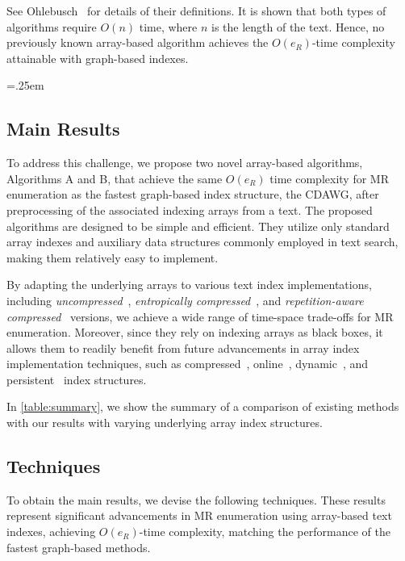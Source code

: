 See Ohlebusch~\cite{ohlebusch2013bookbioinfo} for details of their definitions. 
It is shown that both types of algorithms require $O(n)$ time, where $n$ is the length of the text. Hence, no previously known array-based algorithm achieves the $O(e_R)$-time complexity attainable with graph-based indexes.

\begin{table}[t]\centering\tabcolsep=.25em 
\end{table}

\subsection{Main Results}
To address this challenge, we propose two novel array-based algorithms, Algorithms A and B, that achieve the same $O(e_R)$ time complexity for MR enumeration as the fastest graph-based index structure, the CDAWG, after preprocessing of the associated indexing arrays from a text. 
The proposed algorithms are designed to be simple and efficient. They utilize only standard array indexes and auxiliary data structures commonly employed in text search, making them relatively easy to implement. 

By adapting the underlying arrays to various text index implementations, including \textit{uncompressed}~\cite{manber:myers1993suffixarrays,Ferragina05:FM}, \textit{entropically compressed}~\cite{belazzougui:cunial:gagie:prezza:raffinot2015composite,belazzougui2020linear}, and \textit{repetition-aware compressed}~\cite{gagie:navarro:prezza2020fully,kempa:kociumaka2023collapsing} versions, we achieve a wide range of time-space trade-offs for MR enumeration.  
Moreover, since they rely on indexing arrays as black boxes, it allows them to readily benefit from future advancements in array index implementation techniques, such as compressed~\cite{gagie:navarro:prezza2020fully,kempa:kociumaka2023collapsing}, online~\cite{kopelowitz2012online}, dynamic~\cite{kempa2022dynamic,liptak2024textbooksolution}, and persistent~\cite{driscoll:sarnak:sleator:tarjan1986makingpersistent} index structures. 

In \cref{table:summary}, we show the summary of a comparison of existing methods with our results with varying underlying array index structures. 

\clearpage
\subsection{Techniques}
To obtain the main results, we devise the following techniques. These results represent significant advancements in MR enumeration using array-based text indexes, achieving $O(e_R)$-time complexity, matching the performance of the fastest graph-based methods.

